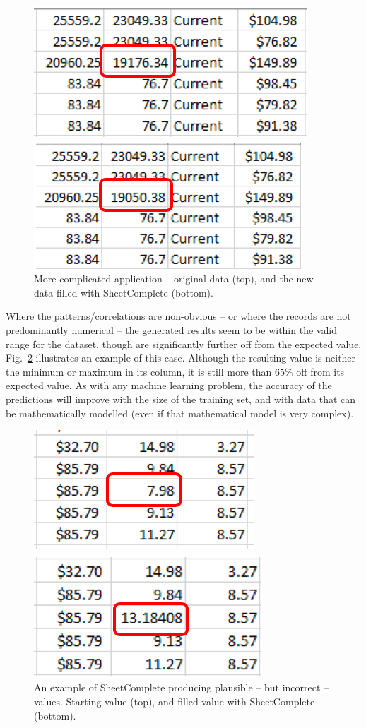 \documentclass[conference]{IEEEtran}
\begin{document}
\begin{figure}[htbp]
\centerline{\includegraphics[width=0.7\columnwidth]{img/gc-start2.png}}
\vspace{3mm}
\centerline{\includegraphics[width=0.7\columnwidth]{img/gc-filled2.png}}
\caption{More complicated application -- original data (top), and the new data filled with SheetComplete (bottom).}
\label{gc-2}
\end{figure}

Where the patterns/correlations are non-obvious -- or where the records are not predominantly numerical -- the generated results seem to be within the valid range for the dataset, though are significantly further off from the expected value. Fig.~\ref{gc-3} illustrates an example of this case. Although the resulting value is neither the minimum or maximum in its column, it is still more than $65\%$ off from its expected value. As with any machine learning problem, the accuracy of the predictions will improve with the size of the training set, and with data that can be mathematically modelled (even if that mathematical model is very complex).

\begin{figure}[htbp]
\centerline{\includegraphics[width=0.5\columnwidth]{img/gc-start3.png}}
\vspace{2mm}
\centerline{\includegraphics[width=0.5\columnwidth]{img/gc-filled3.png}}
\caption{An example of SheetComplete producing plausible -- but incorrect -- values. Starting value (top), and filled value with SheetComplete (bottom).}
\label{gc-3}
\end{figure}
\end{document}

